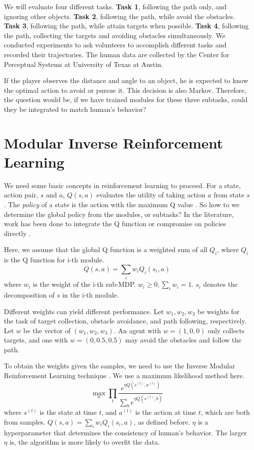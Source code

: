 \documentclass[11pt]{article} %
\begin{document}
We will evaluate four different tasks. {\bf Task 1}, following the path only, and
ignoring other objects. {\bf Task 2}, following the path, while avoid the obstacles.
{\bf Task 3}, following the path, while attain targets when possible. {\bf Task 4},
following the path, collecting the targets and avoiding obstacles
simultaneously.
We conducted experiments to ask volunteers to accomplish different tasks and
recorded their trajectories. The human data are collected by the Center for
Perceptual Systems at University of Texas at Austin.

If the player observes the distance and angle to an object, he is expected to
know the optimal action to avoid or pursue it. This decision is also Markov.
Therefore, the question would be, if we have trained modules for these three
subtasks, could they be integrated to match human's behavior?

\section{Modular Inverse Reinforcement Learning}
\label{sec:rl}

We need some basic concepts in reinforcement learning to proceed. For a state, action
pair, $s$ and $a$, $Q(s, a)$ evaluates the utility of taking action $a$ from
state $s$. The {\em policy} of a state is the action with the maximum Q
value \cite{rl}. So how to we determine the global policy from the modules, or
subtasks? In the literature, work has been done to integrate the Q function
\cite{koller1999computing} or compromise on policies directly
\cite{thomas2012motor}.

Here, we assume that the global Q function is a weighted sum of all $Q_i$, where
$Q_i$ is the Q function for i-th module.
$$Q(s, a) = \sum_i w_i Q_i (s_i, a)$$
where $w_i$ is the weight of the i-th sub-MDP. $w_i \geq 0, \sum_i w_i = 1$.
$s_i$ denotes the decomposition of $s$ in the i-th module.

Different weights can yield different performance. Let $w_1, w_2, w_3$ be
weights for the task of target collection, obstacle avoidance, and path
following, respectively. Let $w$ be the vector of $(w_1, w_2, w_3)$. An agent
with $w = (1, 0, 0)$ only collects targets, and one with $w = (0, 0.5, 0.5)$ may
avoid the obstacles and follow the path.

To obtain the weights given the samples, we need to use the Inverse Modular
Reinforcement Learning technique \cite{rothkopf2013modular}. We use a maximum
likelihood method here.
\begin{equation}
\label{eq:irl}
\max_w \prod_t \frac{e^{\eta Q(s^{(t)}, a^{(t)})}}{\sum_b e^{\eta Q(s^{(t)}, b)}}
\end{equation}
where $s^{(t)}$ is the state at time $t$, and $a^{(t)}$ is the action at time
$t$, which are both from samples. $Q(s, a) = \sum_i w_i Q_i(s_i, a)$, as defined
before. $\eta$ is a hyperparameter that determines the consistency of human's
behavior. The larger $\eta$ is, the algorithm is more likely to overfit the data.
\end{document}
